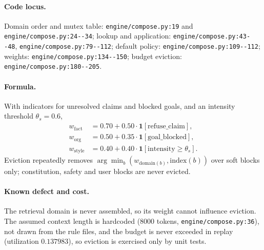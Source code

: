 \paragraph{Code locus.} Domain order and mutex table:
\texttt{engine/\allowbreak{}compose.\allowbreak{}py:\allowbreak{}19} and \texttt{engine/\allowbreak{}compose.\allowbreak{}py:\allowbreak{}24-\allowbreak{}-\allowbreak{}34}; lookup and
application: \texttt{engine/\allowbreak{}compose.\allowbreak{}py:\allowbreak{}43-\allowbreak{}-\allowbreak{}48}, \texttt{engine/\allowbreak{}compose.\allowbreak{}py:\allowbreak{}79-\allowbreak{}-\allowbreak{}112};
default policy: \texttt{engine/\allowbreak{}compose.\allowbreak{}py:\allowbreak{}109-\allowbreak{}-\allowbreak{}112}; weights:
\texttt{engine/\allowbreak{}compose.\allowbreak{}py:\allowbreak{}134-\allowbreak{}-\allowbreak{}150}; budget eviction:
\texttt{engine/\allowbreak{}compose.\allowbreak{}py:\allowbreak{}180-\allowbreak{}-\allowbreak{}205}.

\paragraph{Formula.} With indicators for unresolved claims and blocked goals,
and an intensity threshold $\theta_s = 0.6$,
{\small
\begin{equation}
\begin{aligned}
w_{\mathrm{fact}} &= 0.70 + 0.50\cdot\mathbf{1}[\mathrm{refuse\_claim}],\\
w_{\mathrm{org}} &= 0.50 + 0.35\cdot\mathbf{1}[\mathrm{goal\_blocked}],\\
w_{\mathrm{style}} &= 0.40 + 0.40\cdot\mathbf{1}[\mathrm{intensity} \ge \theta_s].
\end{aligned}
\end{equation}
}
Eviction repeatedly removes $\arg\min_b (w_{\mathrm{domain}(b)}, \mathrm{index}(b))$
over soft blocks only; constitution, safety and user blocks are never evicted.

\paragraph{Known defect and cost.} The retrieval domain is never assembled, so
its weight cannot influence eviction. The assumed context length is hardcoded
(8000 tokens, \texttt{engine/\allowbreak{}compose.\allowbreak{}py:\allowbreak{}36}), not drawn from the rule files, and
the budget is never exceeded in replay (utilization $0.137983$), so eviction is
exercised only by unit tests.

